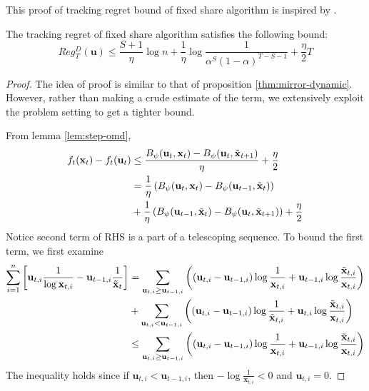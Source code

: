 \documentclass[12pt, a4paper]{report}
\begin{document}
This proof of tracking regret bound of fixed share algorithm is inspired by \cite[Theorem 2]{CesaBianchi2012MirrorDM}.
\begin{thm} 
The tracking regret of fixed share algorithm satisfies the following bound:
\begin{equation*}
    Reg_T^D(\mathbf{u}) \leq \frac{S + 1}{\eta}\log n + \frac{1}{\eta} \log \frac{1}{\alpha^S(1-\alpha)^{T - S- 1}} + \frac{\eta}{2}T
\end{equation*}
\end{thm}
\begin{proof}
The idea of proof is similar to that of proposition \ref{thm:mirror-dynamic}. However, rather than making a crude estimate of the term, we extensively exploit the problem setting to get a tighter bound. 

From lemma \ref{lem:step-omd},
\begin{align*}
    f_t(\mathbf{x}_t) - f_t(\mathbf{u}_t) &\leq \frac{B_\psi(\mathbf{u}_t, \mathbf{x}_t) - B_\psi(\mathbf{u}_t, \Tilde{\mathbf{x}}_{t+1})}{\eta} + \frac{\eta}{2}
    \\
    &= \frac{1}{\eta} \left(B_\psi(\mathbf{u}_t, \mathbf{x}_t) - B_\psi(\mathbf{u}_{t-1}, \Tilde{\mathbf{x}}_{t})\right)
    \\
    &+ \frac{1}{\eta} \left(B_\psi(\mathbf{u}_{t-1}, \Tilde{\mathbf{x}}_{t}) - B_\psi(\mathbf{u}_t, \Tilde{\mathbf{x}}_{t+1}) \right) + \frac{\eta}{2}
\end{align*}
Notice second term of RHS is a part of a telescoping sequence. To bound the first term, we first examine
\begin{align*}
     \sum_{i=1}^n \left[\mathbf{u}_{t, i} \frac{1}{\log \mathbf{x}_{t, i}} - \mathbf{u}_{t-1, i}\frac{1}{\Tilde{\mathbf{x}}_t} \right]
     &= \sum_{\mathbf{u}_{t, i} \geq \mathbf{u}_{t-1, i}} \left((\mathbf{u}_{t, i} - \mathbf{u}_{t-1, i}) \log \frac{1}{\mathbf{x}_{t, i}} + \mathbf{u}_{t-1, i} \log \frac{\Tilde{\mathbf{x}}_{t, i}}{\mathbf{x}_{t, i}}\right)
     \\
     &+ \sum_{\mathbf{u}_{t, i} < \mathbf{u}_{t-1, i}}\left( (\mathbf{u}_{t, i} - \mathbf{u}_{t-1, i})\log \frac{1}{\Tilde{\mathbf{x}}_{t, i}} + \mathbf{u}_{t, i} \log \frac{\Tilde{\mathbf{x}}_{t, i}}{\mathbf{x}_{t, i}}\right)
     \\
     &\leq \sum_{\mathbf{u}_{t, i} \geq \mathbf{u}_{t-1, i}} \left((\mathbf{u}_{t, i} - \mathbf{u}_{t-1, i}) \log \frac{1}{\mathbf{x}_{t, i}} + \mathbf{u}_{t-1, i} \log \frac{\Tilde{\mathbf{x}}_{t, i}}{\mathbf{x}_{t, i}}\right)
\end{align*}
The inequality holds since if $\mathbf{u}_{t, i} < \mathbf{u}_{t-1, i}$, then $-\log\frac{1}{\mathbf{x}_{t, i}} < 0$ and $\mathbf{u}_{t, i} = 0$.


\end{proof}
\end{document}
